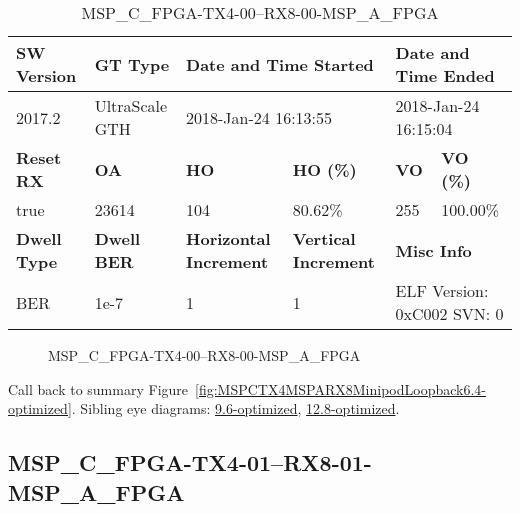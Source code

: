 \begin{table}[h]
\centering
\caption{MSP\_C\_FPGA-TX4-00--RX8-00-MSP\_A\_FPGA}
\label{tab:MSPCFPGATX400RX800MSPAFPGA6.4-optimized}
\begin{tabular}{@{}|l|l|l|l|l|l|@{}}
\toprule
\textbf{SW Version}                & \textbf{GT Type}   & \multicolumn{2}{l|}{\textbf{Date and Time Started}}            & \multicolumn{2}{l|}{\textbf{Date and Time Ended}}        \\ \midrule
2017.2                       & UltraScale GTH          & \multicolumn{2}{l|}{2018-Jan-24 16:13:55}                   & \multicolumn{2}{l|}{2018-Jan-24 16:15:04}               \\ \midrule
\textbf{Reset RX}                  & \textbf{OA} & \textbf{HO}   & \textbf{HO (\%)} & \textbf{VO} & \textbf{VO (\%)} \\ \midrule
true & 23614        & 104          & 80.62\%        & 255        & 100.00\%       \\ \midrule
\textbf{Dwell Type}                & \textbf{Dwell BER} & \textbf{Horizontal Increment} & \textbf{Vertical Increment}    & \multicolumn{2}{l|}{\textbf{Misc Info}}                  \\ \midrule
BER                            & 1e-7        & 1        & 1           & \multicolumn{2}{l|}{ELF Version: 0xC002 SVN: 0}                         \\ \bottomrule
\end{tabular}
\end{table}

\begin{figure}[h]
\caption{MSP\_C\_FPGA-TX4-00--RX8-00-MSP\_A\_FPGA} \label{fig:MSPCFPGATX400RX800MSPAFPGA6.4-optimized}
\end{figure}

Call back to summary Figure~\ref{fig:MSPCTX4MSPARX8MinipodLoopback6.4-optimized}.
Sibling eye diagrams: \hyperref[sec:MSPCFPGATX400RX800MSPAFPGA9.6-optimized]{9.6-optimized}, \hyperref[sec:MSPCFPGATX400RX800MSPAFPGA12.8-optimized]{12.8-optimized}.

\clearpage
\newpage


\subsection{MSP\_C\_FPGA-TX4-01--RX8-01-MSP\_A\_FPGA}\label{sec:MSPCFPGATX401RX801MSPAFPGA6.4-optimized}


